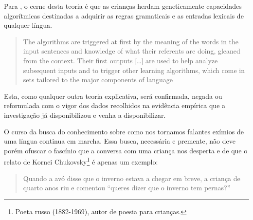 \documentclass[output=paper]{LSP/langsci}
\begin{document}
Para \citet{pinker1984}, o cerne desta teoria é que as crianças herdam geneticamente capacidades algorítmicas destinadas a adquirir as regras gramaticais e as entradas lexicais de qualquer língua. 

\begin{quote}
The algorithms are triggered at first by the meaning of the words in the input sentences and knowledge of what their referents are doing, gleaned from the context. Their first outputs […] are used to help analyze subsequent inputs and to trigger other learning algorithms, which come in sets tailored to the major components of language \citep[xv]{pinker1984}
\end{quote}

Esta, como qualquer outra teoria explicativa, será confirmada, negada ou reformulada com o vigor dos dados recolhidos na evidência empírica que a investigação já disponibilizou e venha a disponibilizar.

O curso da busca do conhecimento sobre como nos tornamos falantes exímios de uma língua continua em marcha. Essa busca, necessária e premente, não deve porém ofuscar o fascínio que a conversa com uma criança nos desperta e de que o relato de Kornei Chukovsky\footnote{Poeta russo (1882-1969), autor de poesia para crianças.} é apenas um exemplo:

\begin{quote}
Quando a avó disse que o inverno estava a chegar em breve, a criança de quarto anos riu e comentou “queres dizer que o inverno tem pernas?'' \citeyearpar[tradução livre da versão inglesa de][11]{chukovsky1963}
\end{quote}

{\sloppy
\printbibliography[heading=subbibliography,notkeyword=this]
}
\end{document}

